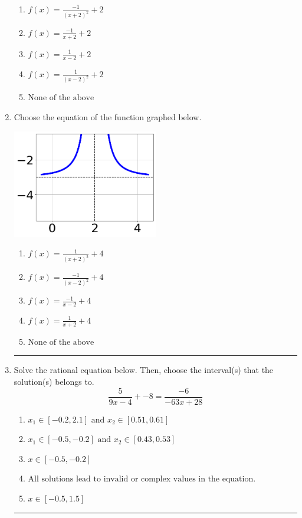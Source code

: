\documentclass[14pt]{extbook}
\newcommand{\litem}[1]{\item#1\hspace*{-1cm}\rule{\textwidth}{0.4pt}}
\begin{document}
\begin{enumerate}
{\begin{center}
\end{center}
\begin{enumerate}[label=\Alph*.]
\item \( f(x) = \frac{-1}{(x + 2)^2} + 2 \)
\item \( f(x) = \frac{-1}{x + 2} + 2 \)
\item \( f(x) = \frac{1}{x - 2} + 2 \)
\item \( f(x) = \frac{1}{(x - 2)^2} + 2 \)
\item \( \text{None of the above} \)

\end{enumerate} }
\litem{
Choose the equation of the function graphed below.
\begin{center}
    \includegraphics[width=0.5\textwidth]{../Figures/rationalGraphToEquationA.png}
\end{center}
\begin{enumerate}[label=\Alph*.]
\item \( f(x) = \frac{1}{(x + 2)^2} + 4 \)
\item \( f(x) = \frac{-1}{(x - 2)^2} + 4 \)
\item \( f(x) = \frac{-1}{x - 2} + 4 \)
\item \( f(x) = \frac{1}{x + 2} + 4 \)
\item \( \text{None of the above} \)

\end{enumerate} }
\litem{
Solve the rational equation below. Then, choose the interval(s) that the solution(s) belongs to.\[ \frac{5}{9x -4} + -8 = \frac{-6}{-63x + 28} \]\begin{enumerate}[label=\Alph*.]
\item \( x_1 \in [-0.2, 2.1] \text{ and } x_2 \in [0.51,0.61] \)
\item \( x_1 \in [-0.5, -0.2] \text{ and } x_2 \in [0.43,0.53] \)
\item \( x \in [-0.5,-0.2] \)
\item \( \text{All solutions lead to invalid or complex values in the equation.} \)
\item \( x \in [-0.5,1.5] \)


\end{enumerate}}
\end{enumerate}
\end{document}
